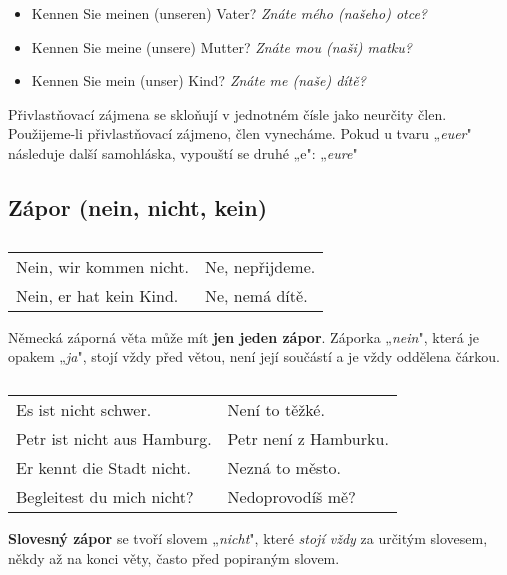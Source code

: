       \begin{itemize}\addtolength{\itemsep}{-0.5\baselineskip} %
        \item Kennen Sie meinen (unseren) Vater? \emph{Znáte mého (našeho) otce?}
        \item Kennen Sie meine (unsere) Mutter? \emph{Znáte mou (naši) matku?} 
        \item Kennen Sie mein (unser) Kind? \emph{Znáte me (naše) dítě?}
      \end{itemize}
      Přivlastňovací zájmena se skloňují v jednotném čísle jako neurčity člen. Použijeme-li 
      přivlastňovací zájmeno, člen vynecháme. Pokud u tvaru „\emph{euer}" následuje další 
      samohláska, vypouští se druhé „e": „\emph{eure}"
  
    \subsection*{Zápor (nein, nicht, kein)}  %
      \begin{table}[ht!]  
        \begin{tabular}{ll} 
          Nein, wir kommen nicht. & Ne, nepřijdeme. \\
          Nein, er hat kein Kind. & Ne, nemá dítě.
        \end{tabular}
        \caption*{ }
      \end{table}
      Německá záporná věta může mít \textbf{jen jeden zápor}. Záporka „\emph{nein}", která je 
      opakem „\emph{ja}", stojí vždy před větou, není její součástí a je vždy oddělena čárkou.
      
      \begin{table}[ht!]   
        \begin{tabular}{ll} 
          Es ist nicht schwer.        & Není to těžké.        \\ 
          Petr ist nicht aus Hamburg. & Petr není z Hamburku. \\
          Er kennt die Stadt nicht.   & Nezná to město.       \\
          Begleitest du mich nicht?   & Nedoprovodíš mě?
        \end{tabular}
        \caption*{ }
      \end{table}
      \textbf{Slovesný zápor} se tvoří slovem „\emph{nicht}", které \emph{stojí vždy} za určitým 
      slovesem, někdy až na konci věty, často před popiraným slovem.
  
